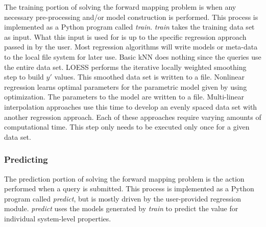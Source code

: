 The training portion of solving the forward mapping problem is when any necessary pre-processing and/or model construction is performed.
This process is implemented as a Python program called \textit{train}.
\textit{train} takes the training data set as input.
What this input is used for is up to the specific regression approach passed in by the user.
Most regression algorithms will write models or meta-data to the local file system for later use.
Basic kNN does nothing since the queries use the entire data set.
LOESS performs the iterative locally weighted smoothing step to build $y'$ values.
This smoothed data set is written to a file.
Nonlinear regression learns optimal parameters for the parametric model given by using optimization.
The parameters to the model are written to a file.
Multi-linear interpolation approaches use this time to develop an evenly spaced data set with another regression approach.
Each of these approaches require varying amounts of computational time.
This step only needs to be executed only once for a given data set.


\subsubsection{Predicting}

The prediction portion of solving the forward mapping problem is the action performed when a query is submitted.
This process is implemented as a Python program called \textit{predict}, but is mostly driven by the user-provided regression module.
\textit{predict} uses the models generated by \textit{train} to predict the value for individual system-level properties.

